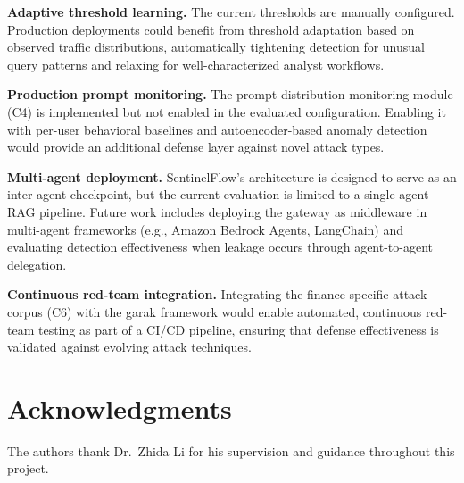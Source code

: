 \documentclass[journal,12pt,onecolumn,draftclsnofoot]{IEEEtran}
\begin{document}
\textbf{Adaptive threshold learning.} The current thresholds are manually configured. Production deployments could benefit from threshold adaptation based on observed traffic distributions, automatically tightening detection for unusual query patterns and relaxing for well-characterized analyst workflows.

\textbf{Production prompt monitoring.} The prompt distribution monitoring module (C4) is implemented but not enabled in the evaluated configuration. Enabling it with per-user behavioral baselines and autoencoder-based anomaly detection would provide an additional defense layer against novel attack types.

\textbf{Multi-agent deployment.} SentinelFlow's architecture is designed to serve as an inter-agent checkpoint, but the current evaluation is limited to a single-agent RAG pipeline. Future work includes deploying the gateway as middleware in multi-agent frameworks (e.g., Amazon Bedrock Agents, LangChain) and evaluating detection effectiveness when leakage occurs through agent-to-agent delegation.

\textbf{Continuous red-team integration.} Integrating the finance-specific attack corpus (C6) with the garak framework would enable automated, continuous red-team testing as part of a CI/CD pipeline, ensuring that defense effectiveness is validated against evolving attack techniques.


\section*{Acknowledgments}
The authors thank Dr.\ Zhida Li for his supervision and guidance throughout this project.
\end{document}
